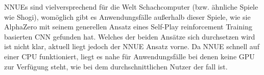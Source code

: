 \acp{NNUE} sind vielversprechend für die Welt Schachcomputer (bzw. ähnliche Spiele wie Shogi), womöglich gibt es Anwendungsfälle außerhalb dieser Spiele, wie sie AlphaZero mit seinem generellen Ansatz eines Self-Play reinforcement Training basierten \ac{CNN} gefunden hat. Welches der beiden Ansätze sich durchsetzen wird ist nicht klar, aktuell liegt jedoch der \ac{NNUE} Ansatz vorne. Da \ac{NNUE} schnell auf einer CPU funktioniert, liegt es nahe für Anwendungsfälle bei denen keine GPU zur Verfügung steht, wie bei dem durchschnittlichen Nutzer der fall ist.